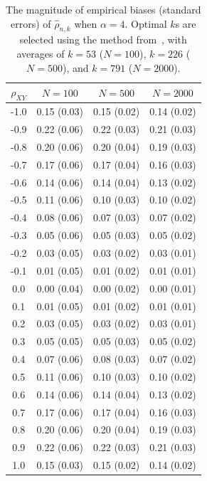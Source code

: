 \documentclass[lineno]{biometrika}
\newcommand \ag{\alpha}
\begin{document}
\begin{table}[ht]
\centering
\caption{The magnitude of empirical biases (standard errors) of $\hat{\rho}_{n,k}$ when $\ag=4$. Optimal $k$s are selected using the method from~\citet{clauset:shalizi:newman:2009}, with averages of $k=53$ ($N=100$), $k=226$ ($N=500$), and  $k=791$ ($N=2000$).
\label{t:sim6}}
\medskip
\begin{tabular}{cccc}
  \hline\hline
 $\rho_{XY}$ & $N=100$ &  $N=500$ & $N=2000$  \\
  \hline
-1.0 & 0.15 (0.03) & 0.15 (0.02) & 0.14 (0.02) \\
-0.9 & 0.22 (0.06) & 0.22 (0.03) & 0.21 (0.03) \\
-0.8 & 0.20 (0.06) & 0.20 (0.04) & 0.19 (0.03) \\
-0.7 & 0.17 (0.06) & 0.17 (0.04) & 0.16 (0.03) \\
-0.6 & 0.14 (0.06) & 0.14 (0.04) & 0.13 (0.02) \\
-0.5 & 0.11 (0.06) & 0.10 (0.03) & 0.10 (0.02) \\
-0.4 & 0.08 (0.06) & 0.07 (0.03) & 0.07 (0.02) \\
-0.3 & 0.05 (0.06) & 0.05 (0.03) & 0.05 (0.02) \\
-0.2 & 0.03 (0.05) & 0.03 (0.02) & 0.03 (0.01) \\
-0.1 & 0.01 (0.05) & 0.01 (0.02) & 0.01 (0.01) \\
0.0 & 0.00 (0.04) & 0.00 (0.02) & 0.00 (0.01) \\
0.1 & 0.01 (0.05) & 0.01 (0.02) & 0.01 (0.01) \\
0.2 & 0.03 (0.05) & 0.03 (0.02) & 0.03 (0.01) \\
0.3 & 0.05 (0.05) & 0.05 (0.03) & 0.05 (0.02) \\
0.4 & 0.07 (0.06) & 0.08 (0.03) & 0.07 (0.02) \\
0.5 & 0.11 (0.06) & 0.10 (0.03) & 0.10 (0.02) \\
0.6 & 0.14 (0.06) & 0.14 (0.04) & 0.13 (0.02) \\
0.7 & 0.17 (0.06) & 0.17 (0.04) & 0.16 (0.03) \\
0.8 & 0.20 (0.06) & 0.20 (0.04) & 0.19 (0.03) \\
0.9 & 0.22 (0.06) & 0.22 (0.03) & 0.21 (0.03) \\
1.0 & 0.15 (0.03) & 0.15 (0.02) & 0.14 (0.02) \\
\hline\hline
\end{tabular}
\end{table}
\end{document}
